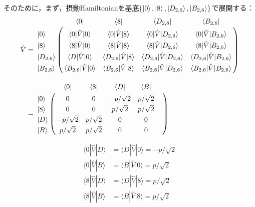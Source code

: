 そのために，まず，摂動Hamiltonianを基底$\{\ket{0},\ket{8},\ket{D_{2,6}},\ket{B_{2,6}}\}$で展開する：
\begin{align}
     \hat{V}
    &=
   \bordermatrix{     
    & \bra{0} &  \bra{8} &  \bra{D_{2,6}}&  \bra{B_{2,6}}\cr
   \ket{0}&\langle{0|\hat{V}|0}\rangle&\langle{0|\hat{V}|8}\rangle&\langle{0|\hat{V}|D_{2,6}}\rangle
   &\langle{0|\hat{V}|B_{2,6}}\rangle\cr
  \ket{8}&\langle{8|\hat{V}|0}\rangle&\langle{8|\hat{V}|8}\rangle&\langle{8|\hat{V}|D_{2,6}}\rangle
   &\langle{8|\hat{V}|B_{2,6}}\rangle\cr
  \ket{D_{2,6}}&\langle{D|\hat{V}|0}\rangle&\langle{D_{2,6}|\hat{V}|8}\rangle&\langle{D_{2,6}|\hat{V}|D_{2,6}}\rangle
   &\langle{D_{2,6}|\hat{V}|B_{2,6}}\rangle\cr
  \ket{B_{2,6}}&\langle{B_{2,6}|\hat{V}|0}\rangle&\langle{B_{2,6}|\hat{V}|8}\rangle&\langle{B_{2,6}|\hat{V}|D_{2,6}}\rangle
   &\langle{B_{2,6}|\hat{V}|B_{2,6}}\rangle\cr
    }\\[10pt]
    &=
   \bordermatrix{     
    & \bra{0} &  \bra{8} &  \bra{D}&  \bra{B}\cr
   \ket{0}&0&0&-p/\sqrt{2}&p/\sqrt{2}\cr
  \ket{8}&0&0&p/\sqrt{2}&p/\sqrt{2}\cr
  \ket{D}&-p/\sqrt{2}&p/\sqrt{2}&0&0\cr
  \ket{B}&p/\sqrt{2}&p/\sqrt{2}&0&0&\cr
            }
\end{align}

\begin{align}
    \langle{0|\hat{V}|D}\rangle&=\langle{D|\hat{V}|0}\rangle=-p/\sqrt{2}\\[10pt]
    \langle{0|\hat{V}|B}\rangle&=\langle{B|\hat{V}|0}\rangle=p/\sqrt{2}\\[10pt]
    \langle{8|\hat{V}|D}\rangle&=\langle{D|\hat{V}|8}\rangle=p/\sqrt{2}\\[10pt]
   \langle{8|\hat{V}|B}\rangle&=\langle{B|\hat{V}|8}\rangle=p/\sqrt{2}
\end{align}

